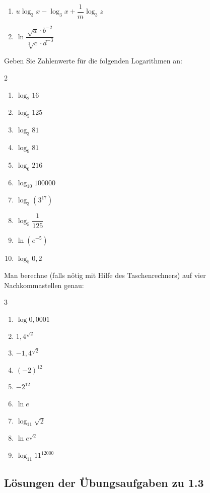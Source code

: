 \begin{uebungsaufgaben}
\begin{enumerate}[label=\alph*)]
      \item $u\log_3 x - \log_3 x + \dfrac{1}{m}\log_3 z$
      \item $\ln \dfrac{\sqrt{a} \cdot b^{-2}}{\sqrt[3]{c} \cdot d^{-3}}$
    \end{enumerate}
  \item Geben Sie Zahlenwerte für die folgenden Logarithmen an:
    \begin{multicols}{2}
    \begin{enumerate}[label=\alph*)]
      \item $\log_2 16$
      \item $\log_5 125$
      \item $\log_3 81$
      \item $\log_9 81$
      \item $\log_6 216$
      \item $\log_{10} 100000$
      \item $\log_3 (3^{17})$
      \item $\log_5 \dfrac{1}{125}$
      \item $\ln (e^{-5})$
      \item $\log_5 0{,}2$
    \end{enumerate}
    \end{multicols}
  \item Man berechne (falls nötig mit Hilfe des Taschenrechners) auf vier Nachkommastellen genau:
    \begin{multicols}{3}
    \begin{enumerate}[label=\alph*)]
      \item $\log 0{,}0001$
      \item $1{,}4^{\sqrt{2}}$
      \item $-1{,}4^{\sqrt{2}}$
      \item $(-2)^{12}$
      \item $-2^{12}$
      \item $\ln e$
      \item $\log_{11} \sqrt{2}$
      \item $\ln e^{\sqrt{2}}$
      \item $\log_{11} 11^{12000}$
    \end{enumerate}
    \end{multicols}
\end{uebungsaufgaben}

\subsection{Lösungen der Übungsaufgaben zu 1.3}

